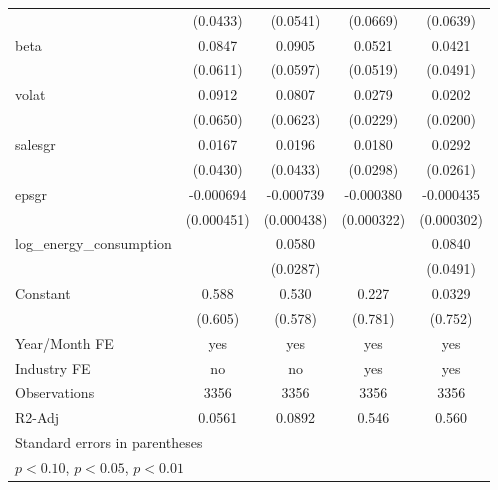 \begin{table}[htbp]
\begin{tabular}{l*{4}{c}}
                    &    (0.0433)         &    (0.0541)         &    (0.0669)         &    (0.0639)         \\
[1em]
beta                &      0.0847         &      0.0905         &      0.0521         &      0.0421         \\
                    &    (0.0611)         &    (0.0597)         &    (0.0519)         &    (0.0491)         \\
[1em]
volat               &      0.0912         &      0.0807         &      0.0279         &      0.0202         \\
                    &    (0.0650)         &    (0.0623)         &    (0.0229)         &    (0.0200)         \\
[1em]
salesgr             &      0.0167         &      0.0196         &      0.0180         &      0.0292         \\
                    &    (0.0430)         &    (0.0433)         &    (0.0298)         &    (0.0261)         \\
[1em]
epsgr               &   -0.000694         &   -0.000739\sym{*}  &   -0.000380         &   -0.000435         \\
                    &  (0.000451)         &  (0.000438)         &  (0.000322)         &  (0.000302)         \\
[1em]
log\_energy\_consumption&                     &      0.0580\sym{**} &                     &      0.0840\sym{*}  \\
                    &                     &    (0.0287)         &                     &    (0.0491)         \\
[1em]
Constant            &       0.588         &       0.530         &       0.227         &      0.0329         \\
                    &     (0.605)         &     (0.578)         &     (0.781)         &     (0.752)         \\
\hline
Year/Month FE       &         yes         &         yes         &         yes         &         yes         \\
Industry FE         &          no         &          no         &         yes         &         yes         \\
Observations        &        3356         &        3356         &        3356         &        3356         \\
R2-Adj              &      0.0561         &      0.0892         &       0.546         &       0.560         \\
\hline\hline
\multicolumn{5}{l}{\footnotesize Standard errors in parentheses}\\
\multicolumn{5}{l}{\footnotesize \sym{*} \(p<0.10\), \sym{**} \(p<0.05\), \sym{***} \(p<0.01\)}\\
\end{tabular}
\end{table}
